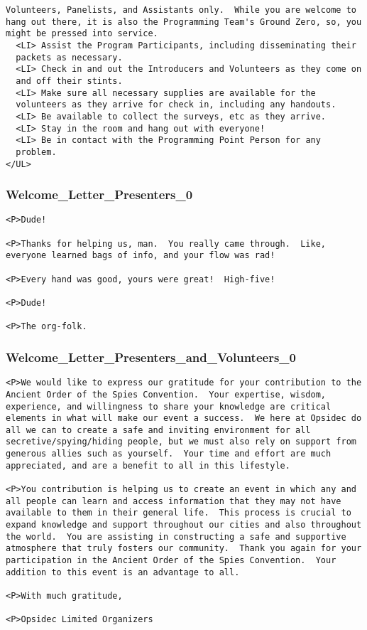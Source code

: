 \documentclass[captions=tablesignature]{scrartcl}
\begin{document}
\begin{verbatim}
Volunteers, Panelists, and Assistants only.  While you are welcome to
hang out there, it is also the Programming Team's Ground Zero, so, you
might be pressed into service.
  <LI> Assist the Program Participants, including disseminating their
  packets as necessary.
  <LI> Check in and out the Introducers and Volunteers as they come on
  and off their stints.
  <LI> Make sure all necessary supplies are available for the
  volunteers as they arrive for check in, including any handouts.
  <LI> Be available to collect the surveys, etc as they arrive.
  <LI> Stay in the room and hang out with everyone!
  <LI> Be in contact with the Programming Point Person for any
  problem.
</UL>
\end{verbatim}

\subsubsection{Welcome\_Letter\_Presenters\_0}
\label{sec-3-7-6}
\begin{verbatim}
<P>Dude!

<P>Thanks for helping us, man.  You really came through.  Like,
everyone learned bags of info, and your flow was rad!

<P>Every hand was good, yours were great!  High-five!

<P>Dude!

<P>The org-folk.
\end{verbatim}

\subsubsection{Welcome\_Letter\_Presenters\_and\_Volunteers\_0}
\label{sec-3-7-7}
\begin{verbatim}
<P>We would like to express our gratitude for your contribution to the
Ancient Order of the Spies Convention.  Your expertise, wisdom,
experience, and willingness to share your knowledge are critical
elements in what will make our event a success.  We here at Opsidec do
all we can to create a safe and inviting environment for all
secretive/spying/hiding people, but we must also rely on support from
generous allies such as yourself.  Your time and effort are much
appreciated, and are a benefit to all in this lifestyle.

<P>You contribution is helping us to create an event in which any and
all people can learn and access information that they may not have
available to them in their general life.  This process is crucial to
expand knowledge and support throughout our cities and also throughout
the world.  You are assisting in constructing a safe and supportive
atmosphere that truly fosters our community.  Thank you again for your
participation in the Ancient Order of the Spies Convention.  Your
addition to this event is an advantage to all.

<P>With much gratitude,

<P>Opsidec Limited Organizers
\end{verbatim}
\end{document}
